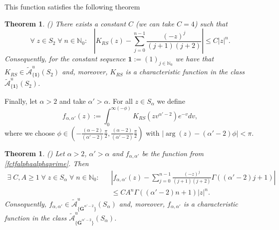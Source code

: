 \documentclass[11pt,a4paper]{article}
\theoremstyle{plain}
\newtheorem{theorem}[proposition]{Theorem}
\theoremstyle{definition}
\newcommand{\CC}{\mathbb{C}}
\newcommand{\NN}{\mathbb{N}}
\newcommand{\G}{\mathbf{G}}
\begin{document}
This function satisfies the following theorem %

\begin{theorem}\label{RStheorem} (\cite[Thm. 3]{salinas62})
	There exists a constant $C$ (we can take $C=4$) such that
	 $$\forall\;z\in S_2%
	 \;\forall\;n\in\NN_0:\;\;\;\left| K_{RS}(z)-\sum_{j=0}^{n-1} \frac{(-z)^j}{(j+1)(j+2)}\right|\leq C|z|^n.$$
	Consequently, for the constant sequence $\mathbf{1}:=(1)_{j\in\NN_0}$ we have that  $K_{RS}\in\widetilde{\mathcal{A}}^u_{\{\mathbf{1}\}}(S_2)$ and, moreover, $K_{RS}$ is a characteristic function in the class $\widetilde{\mathcal{A}}^u_{\{ \mathbf{1}\}}(S_2)$.
\end{theorem}
%
%
Finally, let $\alpha>2$ and take $\alpha'>\alpha$. For all $z\in S_\alpha$ we define
\begin{equation}\label{fctfalphaalphaprime}
	f_{\alpha,\alpha'}(z):= \int_{0}^{\infty(-\phi)} K_{RS}(zv^{\alpha'-2}) e^{-v} dv,
\end{equation}
where we choose $\phi  \in (-\frac{(\alpha-2)}{(\alpha'-2)}\frac{\pi}{2}, \frac{(\alpha-2)}{(\alpha'-2)}\frac{\pi}{2})$ with $|\arg(z)- (\alpha'-2)\phi|<\pi$.\\
\begin{theorem}\label{fgalphaalphaprimethm} (\cite[Thm. 4, Thm. 8]{salinas62})
	Let $\alpha>2$, $\alpha'>\alpha$ and
	$f_{\alpha,\alpha'}$ be the function from
	\eqref{fctfalphaalphaprime}. Then
				\begin{align*}%
						\exists\;C,A\ge 1\;\forall\;z\in S_{\alpha}\;\forall\;n\in\NN_0:\;\;\;&\left|f_{\alpha,\alpha'} (z) -\sum_{j=0}^{n-1} \frac{(-z)^j}{(j+1)(j+2)} \Gamma (  (\alpha'-2)j+1)\right|\nonumber
						\\&
						\le CA^n \Gamma ( (\alpha'-2)n+1)|z|^n.
					\end{align*}
				Consequently, $f_{\alpha,\alpha'}\in\widetilde{\mathcal{A}}^u_{\{\overline{\G}^{\alpha'-2}\}}(S_\alpha)$ and,
				moreover, $f_{\alpha,\alpha'}$ is a characteristic function in the class $\widetilde{\mathcal{A}}^u_{\{ \overline{\G}^{\alpha'-2} \}}(S_\alpha)$.
	\end{theorem}
\end{document}
